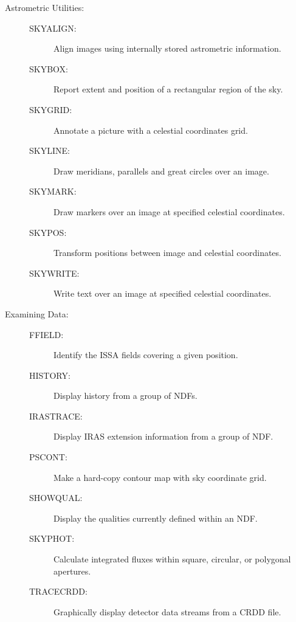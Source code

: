 \documentclass[twoside,11pt]{starlink}
\begin{document}
\begin{description}

\item [Astrometric Utilities:]
\mbox{}
\begin{description}
\item[SKYALIGN: ] Align images using internally stored astrometric
information.
\item[SKYBOX:   ] Report extent and position of a rectangular region of the
sky.
\item[SKYGRID:  ] Annotate a picture with a celestial coordinates grid.
\item[SKYLINE:  ] Draw meridians, parallels and great circles over an
image.
\item[SKYMARK:  ] Draw markers over an image at specified celestial
coordinates.
\item[SKYPOS:   ] Transform positions between image and celestial
coordinates.
\item[SKYWRITE: ] Write text over an image at specified celestial
coordinates.
\end{description}

\item [Examining Data:]
\mbox{}
\begin{description}
\item[FFIELD:   ] Identify the ISSA fields covering a given position.
\item[HISTORY:  ] Display history from a group of NDFs.
\item[IRASTRACE:] Display IRAS extension information from a group of NDF.
\item[PSCONT:   ] Make a hard-copy contour map with sky coordinate grid.
\item[SHOWQUAL: ] Display the qualities currently defined within an NDF.
\item[SKYPHOT:  ] Calculate integrated fluxes within square, circular, or
polygonal apertures.
\item[TRACECRDD: ] Graphically display detector data streams from a CRDD
file.
\end{description}


\end{description}
\end{document}
